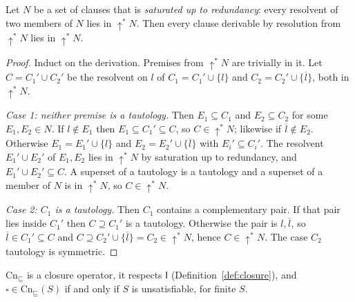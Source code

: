 \begin{lemma}
\label{lem:red-lifting}
Let $N$ be a set of clauses that is \emph{saturated up to redundancy}: every resolvent of two members of $N$ lies in $\uparrow^{\ast}\!N$. Then every clause derivable by resolution from $\uparrow^{\ast}\!N$ lies in $\uparrow^{\ast}\!N$.
\end{lemma}

\begin{proof}
Induct on the derivation. Premises from $\uparrow^{\ast}\!N$ are trivially in it. Let $C=C_1'\cup C_2'$ be the resolvent on $l$ of $C_1=C_1'\cup\{l\}$ and $C_2=C_2'\cup\{\overline l\}$, both in $\uparrow^{\ast}\!N$.

\emph{Case 1: neither premise is a tautology.} Then $E_1\subseteq C_1$ and $E_2\subseteq C_2$ for some $E_1,E_2\in N$. If $l\notin E_1$ then $E_1\subseteq C_1'\subseteq C$, so $C\in\uparrow^{\ast}\!N$; likewise if $\overline l\notin E_2$. Otherwise $E_1=E_1'\cup\{l\}$ and $E_2=E_2'\cup\{\overline l\}$ with $E_i'\subseteq C_i'$. The resolvent $E_1'\cup E_2'$ of $E_1,E_2$ lies in $\uparrow^{\ast}\!N$ by saturation up to redundancy, and $E_1'\cup E_2'\subseteq C$. A superset of a tautology is a tautology and a superset of a member of $N$ is in $\uparrow^{\ast}\!N$, so $C\in\uparrow^{\ast}\!N$.

\emph{Case 2: $C_1$ is a tautology.} Then $C_1$ contains a complementary pair. If that pair lies inside $C_1'$ then $C\supseteq C_1'$ is a tautology. Otherwise the pair is $l,\overline l$, so $\overline l\in C_1'\subseteq C$ and $C\supseteq C_2'\cup\{\overline l\}=C_2\in\uparrow^{\ast}\!N$, hence $C\in\uparrow^{\ast}\!N$. The case $C_2$ tautology is symmetric.
\end{proof}

\begin{proposition}
\label{prop:cnsub}
$\mathrm{Cn}_{\sqsubseteq}$ is a closure operator, it respects $\mathsf I$ (Definition~\ref{def:closure}), and $\square\in\mathrm{Cn}_{\sqsubseteq}(S)$ if and only if $S$ is unsatisfiable, for finite $S$.
\end{proposition}

